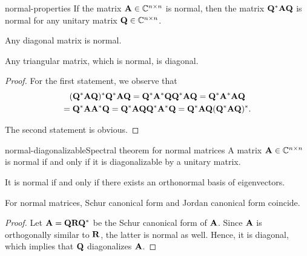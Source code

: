 \begin{Lemma}{normal-properties}
  If the matrix $\mathbf A\in\mathbb C^{n\times n}$ is normal, then the matrix
  $\mathbf Q^*\mathbf A\mathbf Q$ is normal for any unitary matrix $\mathbf Q\in\mathbb C^{n\times n}$.

  Any diagonal matrix is normal.

  Any triangular matrix, which is normal, is diagonal.
\end{Lemma}

\begin{proof}
  For the first statement, we observe that
  \begin{multline}
    (\mathbf Q^*\mathbf A\mathbf Q)^* \mathbf Q^*\mathbf A\mathbf Q
    = \mathbf Q^*\mathbf A^*\mathbf Q\mathbf Q^*\mathbf A\mathbf Q
    = \mathbf Q^*\mathbf A^*\mathbf A\mathbf Q\\
    = \mathbf Q^*\mathbf A\mathbf A^*\mathbf Q
    = \mathbf Q^*\mathbf A\mathbf Q\mathbf Q^*\mathbf A^*\mathbf Q 
    = \mathbf Q^*\mathbf A\mathbf Q(\mathbf Q^*\mathbf A\mathbf Q)^*. 
  \end{multline}

  The second statement is obvious.
\end{proof}

\begin{Theorem*}{normal-diagonalizable}{Spectral theorem for normal matrices}
  A matrix $\mathbf A\in\mathbb C^{n\times n}$ is normal if and only if it is diagonalizable by a unitary matrix.

  It is normal if and only if there exists an orthonormal basis of eigenvectors.

  For normal matrices, Schur canonical form and Jordan canonical form coincide.
\end{Theorem*}

\begin{proof}
  Let $\mathbf A = \mathbf Q\mathbf R\mathbf Q^*$ be the Schur canonical form of
  $\mathbf A$. Since $\mathbf A$ is orthogonally similar to $\mathbf R$, the
  latter is normal as well. Hence, it is diagonal, which implies that
  $\mathbf Q$ diagonalizes $\mathbf A$.
\end{proof}




